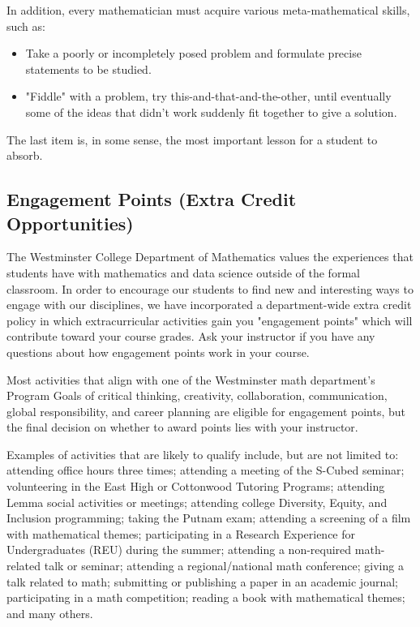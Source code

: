 \documentclass[11pt, a4paper]{article}
\begin{document}
In addition, every mathematician must acquire various meta-mathematical skills, such as:

\begin{itemize}
\item Take a poorly or incompletely posed problem and formulate precise statements to be studied.
\item "Fiddle" with a problem, try this-and-that-and-the-other, until eventually some of the ideas that didn't work suddenly fit together to give a solution.
\end{itemize}

The last item is, in some sense, the most important lesson for a student to absorb.

\subsection*{Engagement Points (Extra Credit Opportunities)}

The Westminster College Department of Mathematics values the experiences that students have with mathematics and data science outside of the formal classroom.  In order to encourage our students to find new and interesting ways to engage with our disciplines, we have incorporated a department-wide extra credit policy in which extracurricular activities gain you "engagement points" which will contribute toward your course grades. Ask your instructor if you have any questions about how engagement points work in your course.

Most activities that align with one of the Westminster math department's Program Goals of critical thinking, creativity, collaboration, communication, global responsibility, and career planning are eligible for engagement points, but the final decision on whether to award points lies with your instructor.

Examples of activities that are likely to qualify include, but are not limited to: attending office hours three times; attending a meeting of the S-Cubed seminar; volunteering in the East High or Cottonwood Tutoring Programs; attending Lemma social activities or meetings; attending college Diversity, Equity, and Inclusion programming; taking the Putnam exam; attending a screening of a film with mathematical themes; participating in a Research Experience for Undergraduates (REU) during the summer; attending a non-required math-related talk or seminar; attending a regional/national math conference; giving a talk related to math; submitting or publishing a paper in an academic journal; participating in a math competition; reading a book with mathematical themes; and many others.
\end{document}
